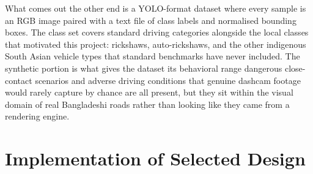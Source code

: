 What comes out the other end is a YOLO-format dataset\cite{jocher2023yolov8} where every sample is an RGB image paired with a text file of class labels and normalised bounding boxes. The class set covers standard driving categories alongside the local classes that motivated this project: rickshaws, auto-rickshaws, and the other indigenous South Asian vehicle types that standard benchmarks have never included. The synthetic portion is what gives the dataset its behavioral range dangerous close-contact scenarios and adverse driving conditions that genuine dashcam footage would rarely capture by chance are all present, but they sit within the visual domain of real Bangladeshi roads rather than looking like they came from a rendering engine.

\section{Implementation of Selected Design}

